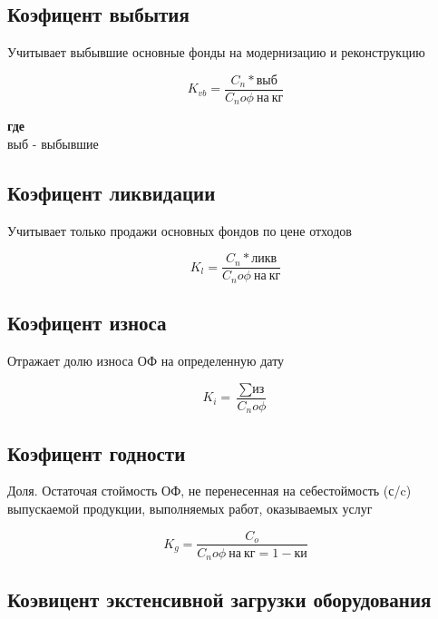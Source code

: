 \documentclass[11pt]{article}
\begin{document}
\subsection{Коэфицент выбытия}
\label{sec:org5fcc2a9}

Учитывает выбывшие основные фонды на модернизацию и реконструкцию


\begin{equation}
  K_{vb} = \frac{C_{n}*\text{выб}}{C_{n}o\phi \  \text{на} \  \text{кг}}
\end{equation}

\textbf{где} \\[0pt]

\(\text{выб}\) - выбывшие

\subsection{Коэфицент ликвидации}
\label{sec:orgbdb78fa}

Учитывает только продажи основных фондов по цене отходов

\begin{equation}
  K_{l} = \frac{C_{n}*\text{ликв}}{C_{n}o\phi \  \text{на} \  \text{кг}}
\end{equation}


\subsection{Коэфицент износа}
\label{sec:org7f6ea83}

Отражает долю износа ОФ на определенную дату

\begin{equation}
  K_{i} = \frac{\sum \text{из}}{C_{n}o\phi}
\end{equation}

\subsection{Коэфицент годности}
\label{sec:orgad70908}

Доля. Остаточая стоймость ОФ, не перенесенная на себестоймость (с/c) выпускаемой продукции, выполняемых работ, оказываемых услуг


\begin{equation}
  K_{g} = \frac{C_{o}}{C_{n}o\phi \ \text{на}\ \text{кг} = 1 - \text{ки}}
\end{equation}


\subsection{Коэвицент экстенсивной загрузки оборудования}
\label{sec:org04834e1}
\end{document}
